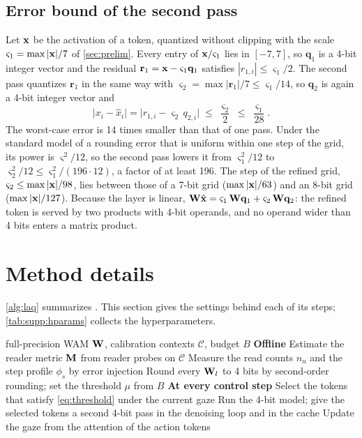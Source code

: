 \subsection{Error bound of the second pass}
\label{sec:supp:theory:refine}
Let $\mathbf{x}$ be the activation of a token, quantized without clipping with the scale $\varsigma_1 = \max|\mathbf{x}| / 7$ of \cref{sec:prelim}.
Every entry of $\mathbf{x} / \varsigma_1$ lies in $[-7, 7]$, so $\mathbf{q}_1$ is a 4-bit integer vector and the residual $\mathbf{r}_1 = \mathbf{x} - \varsigma_1 \mathbf{q}_1$ satisfies $|r_{1,i}| \le \varsigma_1 / 2$.
The second pass quantizes $\mathbf{r}_1$ in the same way with $\varsigma_2 = \max|\mathbf{r}_1| / 7 \le \varsigma_1 / 14$, so $\mathbf{q}_2$ is again a 4-bit integer vector and
\begin{equation}
  \big|x_i - \hat x_i\big| = \big|r_{1,i} - \varsigma_2\, q_{2,i}\big| \;\le\; \frac{\varsigma_2}{2} \;\le\; \frac{\varsigma_1}{28} .
\end{equation}
The worst-case error is 14 times smaller than that of one pass.
Under the standard model of a rounding error that is uniform within one step of the grid, its power is $\varsigma^2 / 12$, so the second pass lowers it from $\varsigma_1^2 / 12$ to $\varsigma_2^2 / 12 \le \varsigma_1^2 / (196 \cdot 12)$, a factor of at least 196.
The step of the refined grid, $\varsigma_2 \le \max|\mathbf{x}| / 98$, lies between those of a 7-bit grid ($\max|\mathbf{x}| / 63$) and an 8-bit grid ($\max|\mathbf{x}| / 127$).
Because the layer is linear, $\mathbf{W} \hat{\mathbf{x}} = \varsigma_1\, \mathbf{W} \mathbf{q}_1 + \varsigma_2\, \mathbf{W} \mathbf{q}_2$: the refined token is served by two products with 4-bit operands, and no operand wider than 4 bits enters a matrix product.

\section{Method details}
\label{sec:supp:method}
\cref{alg:laq} summarizes \method.
This section gives the settings behind each of its steps; \cref{tab:supp:hparams} collects the hyperparameters.

\begin{algorithm}[H]
  \caption{\method}
  \label{alg:laq}
  \small
  \begin{algorithmic}[1]
    \Require full-precision WAM $\mathbf{W}$, calibration contexts $\mathcal{C}$, budget $B$
    \Statex \textbf{Offline}
    \State Estimate the reader metric $\mathbf{M}$ from reader probes on $\mathcal{C}$ 
    \State Measure the read counts $n_u$ and the step profile $\phi_s$ by error injection 
    \State Round every $\mathbf{W}_l$ to 4 bits by second-order rounding; set the threshold $\mu$ from $B$ 
    \Statex \textbf{At every control step}
    \State Select the tokens that satisfy \cref{eq:threshold} under the current gaze
    \State Run the 4-bit model; give the selected tokens a second 4-bit pass in the denoising loop and in the cache 
    \State Update the gaze from the attention of the action tokens
  \end{algorithmic}
\end{algorithm}

